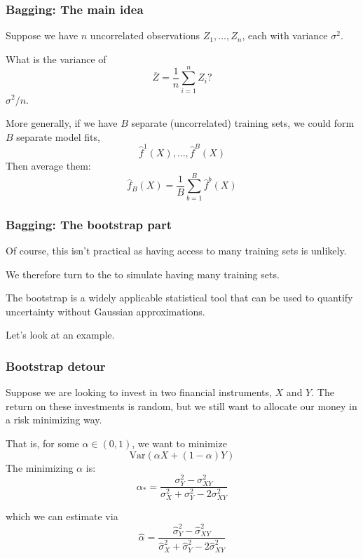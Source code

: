 \documentclass[12pt]{beamer}
\begin{document}
\begin{frame}[fragile]
\frametitle{Bagging: The main idea}
Suppose we have $n$ uncorrelated observations $Z_1, \ldots, Z_n$, each with variance $\sigma^2$.

\vsp
What is the variance of
\[
\overline{Z} = \frac{1}{n} \sum_{i=1}^n Z_i?
\]
\pause
{} $\sigma^2/n$.

\vsp
More generally, if we have $B$ separate (uncorrelated) training sets, we could form $B$ separate model fits, 
\[
\hat f^1(X), \ldots, \hat f^B(X)
\]
Then average them:
\[
\hat f_{B}(X) = \frac{1}{B} \sum_{b=1}^B \hat f^b(X)
\]
\end{frame}

\begin{frame}[fragile]
\frametitle{Bagging: The bootstrap part}
Of course, this isn't practical as having access to many training sets is unlikely.  

\vsp

We therefore
turn to the  to simulate having many training sets.

\vsp
The bootstrap is a widely applicable statistical tool that can be used to quantify uncertainty without Gaussian approximations.

\vsp
Let's look at an example.
\end{frame}

\begin{frame}
      \begin{center}
      \end{center}
\end{frame}

\begin{frame}[fragile]
\frametitle{Bootstrap detour}
Suppose we are looking to invest in two financial instruments, $X$ and $Y$.
The return on these investments is random, but we still want to allocate our money in a risk minimizing way.

\vsp
That is, for some $\alpha \in (0,1)$, we want to minimize
\[
\textrm{Var}(\alpha X + (1-\alpha)Y) 
\]
The minimizing $\alpha$ is:
\[
\alpha_* = \frac{\sigma_Y^2 - \sigma_{XY}^2}{\sigma_X^2 + \sigma_Y^2 - 2\sigma_{XY}^2}
\]

\vsp
which we can estimate via
\[
\hat\alpha = \frac{\hat\sigma_Y^2 - \hat\sigma_{XY}^2}{\hat\sigma_X^2 + \hat\sigma_Y^2 - 2\hat\sigma_{XY}^2}
\]
\end{frame}
\end{document}
